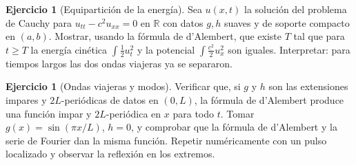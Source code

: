 \documentclass[12pt, a4paper]{amsbook}
\newcommand{\R}{{\mathbb R}}
\theoremstyle{remark}
\theoremstyle{definition}
\newtheorem{ejer}[teo]{Ejercicio}
\numberwithin{section}{chapter}
\numberwithin{subsection}{section}
\numberwithin{equation}{section}
\numberwithin{figure}{chapter}
\begin{document}
\begin{ejer}[Equipartición de la energía]
Sea $u(x,t)$ la solución del problema de Cauchy para $u_{tt} - c^2u_{xx} = 0$ en $\R$ con datos $g,h$ suaves y de soporte compacto en $(a,b)$. Mostrar, usando la fórmula de d'Alembert, que existe $T$ tal que para $t\ge T$ la energía cinética $\int\frac12 u_t^2$ y la potencial $\int\frac{c^2}{2}u_x^2$ son iguales. Interpretar: para tiempos largos las dos ondas viajeras ya se separaron.
\end{ejer}

\begin{ejer}[Ondas viajeras y modos]
Verificar que, si $g$ y $h$ son las extensiones impares y $2L$-periódicas de datos en $(0,L)$, la fórmula de d'Alembert produce una función impar y $2L$-periódica en $x$ para todo $t$. Tomar $g(x) = \sin(\pi x/L)$, $h=0$, y comprobar que la fórmula de d'Alembert y la serie de Fourier dan la misma función. Repetir numéricamente con un pulso localizado y observar la reflexión en los extremos.
\end{ejer}

%
\end{document}
